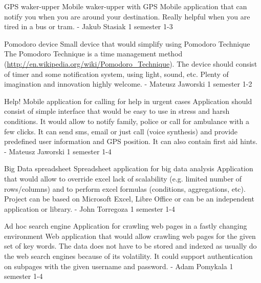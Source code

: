 \begin{project}
{GPS waker-upper}
{Mobile waker-upper with GPS}
{
Mobile application that can notify you when you are around your destination.
Really helpful when you are tired in a bus or tram.
}
{-}
{Jakub Stasiak}
{1 semester}
{1-3}
\end{project}
\begin{project}
{Pomodoro device}
{Small device that would simplify using Pomodoro Technique} 
{ 
The Pomodoro Technique is a time management method
(\url{http://en.wikipedia.org/wiki/Pomodoro\_Technique}). The device should
consist of timer and some notification system, using light, sound, etc. Plenty
of imagination and innovation highly welcome.
}
{-} {Mateusz Jaworski}
{1 semester}
{1-2}
\end{project}
\begin{project}
{Help!}
{Mobile application for calling for help in urgent cases} 
{ 
Application should consist of simple interface that would be easy to use in
stress and harsh conditions. It would allow to notify family, police or call for
ambulance with a few clicks. It can send sms, email or just call (voice
synthesis) and provide predefined user information and GPS position. It can also
contain first aid hints.
} {-}
{Mateusz Jaworski} {1 semester} {1-4}
\end{project}
\begin{project}
{Big Data spreadsheet}
{Spreadsheet application for big data analysis} 
{ 
Application that would allow to override excel lack of scalability (e.g. limited
number of rows/columns) and to perform excel formulas (conditions, aggregations,
etc). Project can be based on Microsoft Excel, Libre Office or can be an
independent application or library.
} 
{-}
{John Torregoza}
{1 semester}
{1-4}
\end{project}
\begin{project}
{Ad hoc search engine}
{Application for crawling web pages in a fastly changing environment} 
{ 
Web application that would allow crawling web pages for the given set of
key words. The data does not have to be stored and indexed as usually do the web
search engines because of its volatility. It could support authentication on
subpages with the given username and password.
}
{-}
{Adam Pomykala}
{1 semester}
{1-4}
\end{project}
